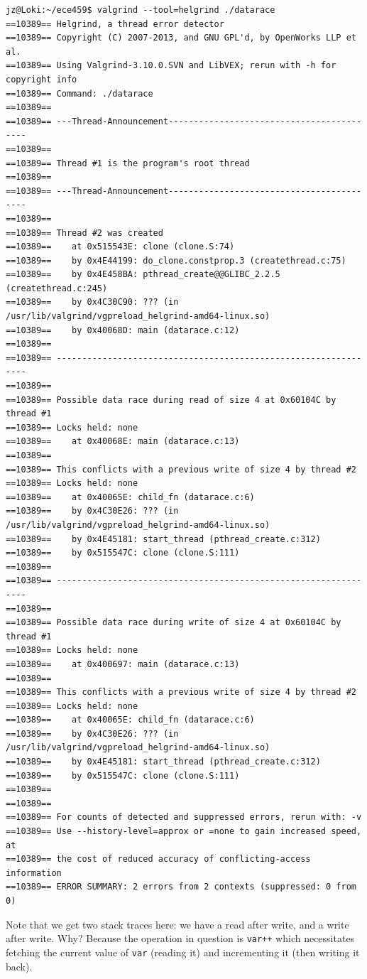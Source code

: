 \documentclass[a4paper]{report}
\begin{document}
\begin{verbatim}
jz@Loki:~/ece459$ valgrind --tool=helgrind ./datarace
==10389== Helgrind, a thread error detector
==10389== Copyright (C) 2007-2013, and GNU GPL'd, by OpenWorks LLP et al.
==10389== Using Valgrind-3.10.0.SVN and LibVEX; rerun with -h for copyright info
==10389== Command: ./datarace
==10389== 
==10389== ---Thread-Announcement------------------------------------------
==10389== 
==10389== Thread #1 is the program's root thread
==10389== 
==10389== ---Thread-Announcement------------------------------------------
==10389== 
==10389== Thread #2 was created
==10389==    at 0x515543E: clone (clone.S:74)
==10389==    by 0x4E44199: do_clone.constprop.3 (createthread.c:75)
==10389==    by 0x4E458BA: pthread_create@@GLIBC_2.2.5 (createthread.c:245)
==10389==    by 0x4C30C90: ??? (in /usr/lib/valgrind/vgpreload_helgrind-amd64-linux.so)
==10389==    by 0x40068D: main (datarace.c:12)
==10389== 
==10389== ----------------------------------------------------------------
==10389== 
==10389== Possible data race during read of size 4 at 0x60104C by thread #1
==10389== Locks held: none
==10389==    at 0x40068E: main (datarace.c:13)
==10389== 
==10389== This conflicts with a previous write of size 4 by thread #2
==10389== Locks held: none
==10389==    at 0x40065E: child_fn (datarace.c:6)
==10389==    by 0x4C30E26: ??? (in /usr/lib/valgrind/vgpreload_helgrind-amd64-linux.so)
==10389==    by 0x4E45181: start_thread (pthread_create.c:312)
==10389==    by 0x515547C: clone (clone.S:111)
==10389== 
==10389== ----------------------------------------------------------------
==10389== 
==10389== Possible data race during write of size 4 at 0x60104C by thread #1
==10389== Locks held: none
==10389==    at 0x400697: main (datarace.c:13)
==10389== 
==10389== This conflicts with a previous write of size 4 by thread #2
==10389== Locks held: none
==10389==    at 0x40065E: child_fn (datarace.c:6)
==10389==    by 0x4C30E26: ??? (in /usr/lib/valgrind/vgpreload_helgrind-amd64-linux.so)
==10389==    by 0x4E45181: start_thread (pthread_create.c:312)
==10389==    by 0x515547C: clone (clone.S:111)
==10389== 
==10389== 
==10389== For counts of detected and suppressed errors, rerun with: -v
==10389== Use --history-level=approx or =none to gain increased speed, at
==10389== the cost of reduced accuracy of conflicting-access information
==10389== ERROR SUMMARY: 2 errors from 2 contexts (suppressed: 0 from 0)
\end{verbatim}

Note that we get two stack traces here: we have a read after write, and a write after write. Why? Because the operation in question is \texttt{var++} which necessitates fetching the current value of \texttt{var} (reading it) and incrementing it (then writing it back).
\end{document}
